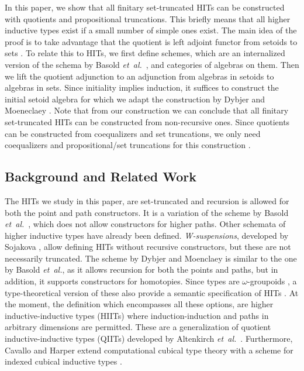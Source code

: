 \documentclass[9pt]{entcs}
\newcommand{\etal}{\emph{et~al.}}
\newcommand{\0}{\textbf{0}} %
\begin{document}
In this paper, we show that all finitary set-truncated HITs can be constructed with quotients and propositional truncations. 
This briefly means that all higher inductive types exist if a small number of simple ones exist.
The main idea of the proof is to take advantage that the quotient is left adjoint functor from setoids to sets \cite{RijkeS15}.
To relate this to HITs, we first define schemes, which are an internalized version of the schema by Basold \etal \ \cite{BasoldGW17}, and categories of algebras on them.
Then we lift the quotient adjunction to an adjunction from algebras in setoids to algebras in sets.
Since initiality implies induction, it suffices to construct the initial setoid algebra for which we adapt the construction by Dybjer and Moeneclaey \cite{DybjerM18,moeneclaey2016schema}.
Note that from our construction we can conclude that all finitary set-truncated HITs can be constructed from non-recursive ones.
Since quotients can be constructed from coequalizers and set truncations, we only need coequalizers and propositional/set truncations for this construction \cite{rijke2017join}.

\subsection{Background and Related Work}
The HITs we study in this paper, are set-truncated and recursion is allowed for both the point and path constructors.
It is a variation of the scheme by Basold \etal \ \cite{BasoldGW17}, which does not allow constructors for higher paths.
Other schemata of higher inductive types have already been defined.
\emph{W-suspensions}, developed by Sojakova \cite{Sojakova15}, allow defining HITs without recursive constructors, but these are not necessarily truncated.
The scheme by Dybjer and Moenclaey is similar to the one by Basold \etal, as it allows recursion for both the points and paths, but in addition, it supports constructors for homotopies.
Since types are $\omega$-groupoids \cite{van2011types,lumsdaine2009weak}, a type-theoretical version of these also provide a semantic specification of HITs \cite{DBLP:conf/tlca/HirschowitzHT15}.
At the moment, the definition which encompasses all these options, are higher inductive-inductive types (HIITs) \cite{KaposiK18} where induction-induction and paths in arbitrary dimensions are permitted.
These are a generalization of quotient inductive-inductive types (QIITs) developed by Altenkirch \etal \ \cite{AltenkirchCDKF18}.
Furthermore, Cavallo and Harper extend computational cubical type theory with a scheme for indexed cubical inductive types \cite{AngiuliHW17,CavalloH19}.
\end{document}

